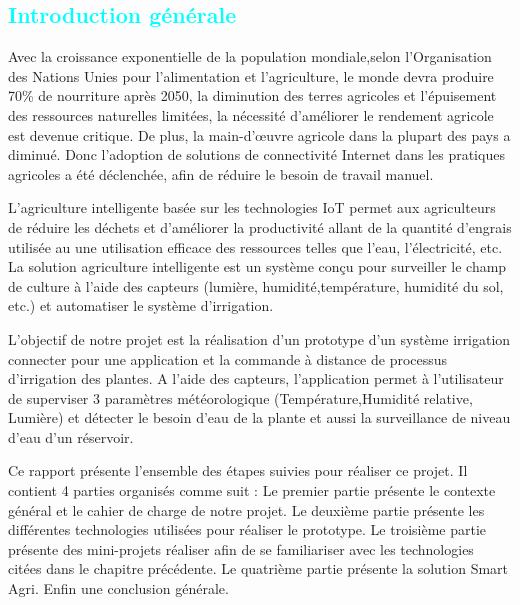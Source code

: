 
\begin{flushleft}
\section*{\textcolor{cyan}{Introduction générale}}
 Avec la croissance exponentielle de la population mondiale,selon l'Organisation des Nations Unies pour l'alimentation et l'agriculture, le monde devra produire 70\% de nourriture après 2050, la diminution des terres agricoles et l'épuisement des ressources naturelles limitées, la nécessité d'améliorer le rendement agricole est devenue critique. De plus, la main-d'œuvre agricole dans la plupart des pays a diminué. Donc l'adoption de solutions de connectivité Internet dans les pratiques agricoles a été déclenchée, afin de réduire le besoin de travail manuel.
 
 L'agriculture intelligente basée sur les technologies IoT permet aux agriculteurs de réduire les déchets et d'améliorer la productivité allant de la quantité d'engrais utilisée au une utilisation efficace des ressources telles que l'eau,  	 	 l'électricité, etc. La solution agriculture intelligente est 
 un système conçu pour surveiller le champ de culture à l'aide des capteurs (lumière, humidité,température, humidité du sol, etc.) et automatiser le système d'irrigation.
  
 L’objectif de notre projet est la réalisation d'un prototype d'un système irrigation connecter pour une application 
 et la commande à distance de processus d’irrigation des plantes. A l’aide des capteurs, l’application permet à l’utilisateur de superviser 3 paramètres météorologique (Température,Humidité relative, Lumière) et détecter le besoin d’eau de la plante et aussi la surveillance de niveau d’eau d’un réservoir. 
 
 Ce rapport présente l’ensemble des étapes suivies pour réaliser ce projet. Il contient 4 parties organisés comme suit :
 Le premier partie présente le contexte général et le cahier de charge de notre projet. Le deuxième partie présente les différentes technologies utilisées pour réaliser le prototype. Le troisième partie présente des mini-projets réaliser afin de se familiariser avec les technologies citées dans le chapitre précédente. Le quatrième partie présente la solution 
 Smart Agri. Enfin une conclusion générale.
\end{flushleft}

\newpage
	